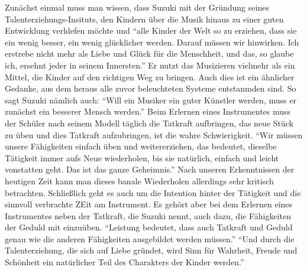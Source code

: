 Zunächst einmal muss man wissen, dass Suzuki mit der Gründung seines
Talenterziehungs-Insituts, den Kindern über die Musik hinaus zu einer guten
Entwicklung verhlefen möchte und \enquote{alle Kinder der Welt so zu erziehen, dass sie
ein wenig besser, ein wenig glücklicher werden. Darauf müssen wir hinwirken. Ich
erstrebe nicht mehr als Liebe und Glück für die Menschheit, und das, so glaube
ich, ersehnt jeder in seinem Innersten.}
\autocite[103]{suzuki:erziehung_ist_liebe}
Er nutzt das Musizieren vielmehr als ein Mittel, die Kinder auf den richtigen
Weg zu bringen. Auch dies ist ein ähnlicher Gedanke, aus dem heraus alle zuvor
beleuchteten Systeme entstanmden sind. So sagt Suzuki nämlich auch: \enquote{Will ein Musiker ein guter
Künstler werden, muss er zunächst ein besserer Mensch
werden.}\autocite[103]{suzuki:erziehung_ist_liebe} Beim Erlernen eines
Instrumentes muss der Schüler nach seinem Modell täglich die Tatkraft
aufbringen, das neue Stück zu üben und dies Tatkraft aufzubringen, ist die wahre
Schwierigkeit. %
\enquote{Wir müssen unsere Fähigkeiten einfach üben und
weitererziehen, das bedeutet, dieselbe Tätigkeit immer aufs Neue wiederholen,
bis sie natürlich, einfach und leicht vonstatten geht. Das ist das ganze
Geheimnis.}\autocite[57]{suzuki:erziehung_ist_liebe} Nach unseren Erkenntnissen der heutigen Zeit kann man
dieses banale Wiederholen allerdings sehr kritisch betrachten. Schließlich geht
es auch um die Intention hinter der Tätigkeit und die sinnvoll verbrachte ZEit
am Instrument. Es gehört aber bei dem
Erlernen eines Instrumentes neben der Tatkraft, die Suzuki nennt, auch dazu, die
Fähigkeiten der Geduld mit einzuüben. \enquote{Leistung bedeutet, dass auch Tatkraft und
Geduld genau wie die anderen Fähigkeiten ausgebildet werden müssen.}
\autocite[60]{suzuki:erziehung_ist_liebe}
\enquote{Und durch die Talenterziehung, die sich auf Liebe gründet, wird Sinn für
Wahrheit, Freude und Schönheit ein natürlicher Teil des Charakters der Kinder
werden.} \autocite[75]{suzuki:erziehung_ist_liebe}

